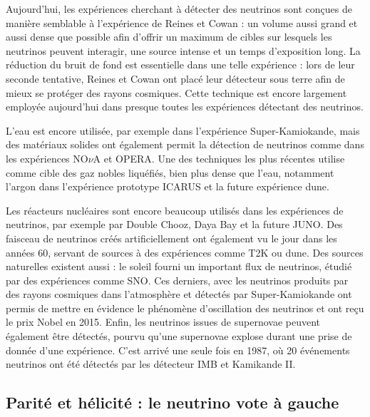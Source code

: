 		    Aujourd'hui, les expériences cherchant à détecter des neutrinos sont conçues de manière semblable à l'expérience de Reines et Cowan : un volume aussi grand et aussi dense que possible afin d'offrir un maximum de cibles sur lesquels les neutrinos  peuvent interagir, une source intense et un temps d'exposition long. La réduction du bruit de fond est essentielle dans une telle expérience : lors de leur seconde tentative, Reines et Cowan ont placé leur détecteur sous terre afin de mieux se protéger des rayons cosmiques. Cette technique est encore largement employée aujourd'hui dans presque toutes les expériences détectant des neutrinos.
		    
		    L'eau est encore utilisée, par exemple dans l'expérience Super-Kamiokande\cite{Fukuda1998}, mais des matériaux solides ont également permit la détection de neutrinos comme dans les expériences NO$\nu$A\cite{ref_needed} et OPERA\cite{opera}. Une des techniques les plus récentes utilise comme cible des gaz nobles liquéfiés, bien plus dense que l'eau, notamment l'argon dans l'expérience prototype ICARUS\cite{Amerio2004} et la future expérience \gls{dune}\cite{Acciari2016a}. 
		    
		    Les réacteurs nucléaires sont encore beaucoup utilisés dans les expériences de neutrinos, par exemple par Double Chooz\cite{ref_needed}, Daya Bay\cite{ref_needed} et la future JUNO\cite{ref_needed}. Des faisceau de neutrinos créés artificiellement ont également vu le jour dans les années 60, servant de sources à des expériences comme T2K\cite{ref_needed} ou \gls{dune}\cite{Strait2016}. Des sources naturelles existent aussi : le soleil fourni un important flux de neutrinos, étudié par des expériences comme SNO\cite{ref_needed}. Ces derniers, avec les neutrinos produits par des rayons cosmiques dans l'atmosphère et détectés par Super-Kamiokande\cite{Fukuda1998} ont permis de mettre en évidence le phénomène d'oscillation des neutrinos et ont reçu le prix Nobel en 2015. Enfin, les neutrinos issues de supernovae peuvent également être détectés, pourvu qu'une supernovae explose durant une prise de donnée d'une expérience. C'est arrivé une seule fois en 1987, où 20 événements neutrinos ont été détectés par les détecteur IMB et Kamikande II\cite{Hirata1987}.
		    
		\subsection{Parité et hélicité : le neutrino vote à gauche}
		
